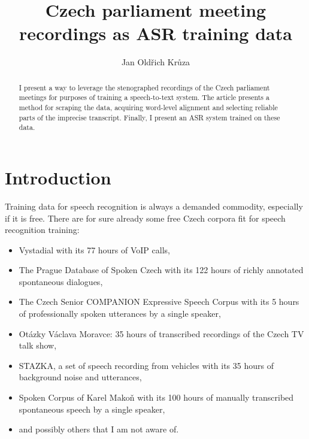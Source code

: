 \documentclass[runningheads]{llncs}
\begin{document}
%
\title{Czech parliament meeting recordings as ASR training data}
%
%
\author{Jan Oldřich Krůza}
%
%
%
\maketitle              %
%
\begin{abstract}
I present a way to leverage the stenographed recordings of the Czech parliament
meetings for purposes of training a speech-to-text system. The article presents
a method for scraping the data, acquiring word-level alignment and selecting
reliable parts of the imprecise transcript. Finally, I present an ASR system
trained on these data.
\end{abstract}

\section{Introduction}
\label{sec:intro}

Training data for speech recognition is always a demanded commodity, especially
if it is free. There are for sure already some free Czech corpora fit for speech
recognition training:
\begin{itemize}
\item{
    Vystadial\cite{vystadialarticle} with its 77 hours of VoIP
    calls\cite{vystadialdata}, 
}
\item{
    The Prague Database of Spoken Czech\cite{pdtscarticle} with its 122 hours
    of richly annotated spontaneous dialogues\cite{pdtscdata},
}
\item{
    The Czech Senior COMPANION Expressive Speech Corpus with its 5 hours
    of professionally spoken utterances by a single speaker\cite{companiondata},
}
\item{
    Otázky Václava Moravce: 35 hours of transcribed recordings of the
    Czech TV talk show\cite{ovmdata},
}
\item{
    STAZKA, a set of speech recording from vehicles with its 35 hours of
    background noise and utterances\cite{stazkadata},
}
\item{
    Spoken Corpus of Karel Makoň\cite{kruuza2012making} with its 100 hours of
    manually transcribed spontaneous speech by a single speaker\cite{makondata},
}
\item{and possibly others that I am not aware of.}
\end{itemize}
\end{document}
